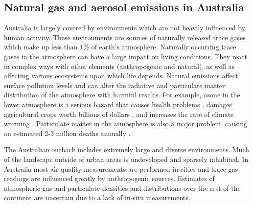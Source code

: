 \subsection{Natural gas and aerosol emissions in Australia}

Australia is largely covered by environments which are not heavily influenced by human activity.
These environments are sources of naturally released trace gases which make up less than 1\% of earth's atmosphere.
Naturally occurring trace gases in the atmosphere can have a large impact on living conditions.
They react in complex ways with other elements (anthropogenic and natural), as well as affecting various ecosystems upon which life depends.
Natural emissions affect surface pollution levels and can alter the radiative and particulate matter distribution of the atmosphere with harmful results.
For example, ozone in the lower atmosphere is a serious hazard that causes health problems \cite{Hsieh_2013}, damages agricultural crops worth billions of dollars \cite{Avnery_2011}, and increases the rate of climate warming \cite{IPCC_2013_chap8}.
Particulate matter in the atmosphere is also a major problem, causing an estimated 2-3 million deaths annually \cite{Hoek_2013, 19627030, Silva_2013, Lelieveld_2015}.

The Australian outback includes extremely large and diverse environments.
Much of the landscape outside of urban areas is undeveloped and sparsely inhabited.
In Australia most air quality measurements are performed in cities and trace gas readings are influenced greatly by anthropogenic sources.
Estimates of atmospheric gas and particulate densities and distributions over the rest of the continent are uncertain due to a lack of in-situ measurements.
  